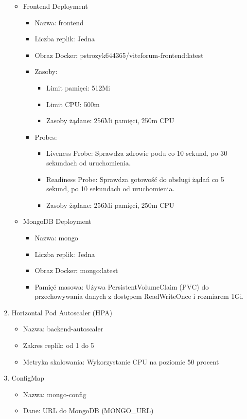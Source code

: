 \documentclass[12pt,a4paper]{article}
\begin{document}
\begin{enumerate}
\begin{itemize}
        
        \item Frontend Deployment
                          \begin{itemize}
                \item Nazwa: frontend
                \item Liczba replik: Jedna
                \item Obraz Docker: pstrozyk644365/viteforum-frontend:latest
                        \item Zasoby:
                \begin{itemize}
                \item Limit pamięci: 512Mi
                \item Limit CPU: 500m
                \item  Zasoby żądane: 256Mi pamięci, 250m CPU
                \end{itemize}
        \item Probes:
                \begin{itemize}
                \item Liveness Probe: Sprawdza zdrowie podu co 10 sekund, po 30 sekundach od uruchomienia.
                \item Readiness Probe: Sprawdza gotowość do obsługi żądań co 5 sekund, po 10 sekundach od uruchomienia.
                \item  Zasoby żądane: 256Mi pamięci, 250m CPU
                \end{itemize}
                \end{itemize}
        \item MongoDB Deployment
                                         \begin{itemize}
                \item Nazwa: mongo
                \item Liczba replik: Jedna
                \item Obraz Docker: mongo:latest
                 \item       Pamięć masowa: Używa PersistentVolumeClaim (PVC) do przechowywania danych z dostępem ReadWriteOnce i rozmiarem 1Gi.
                \end{itemize}
    \end{itemize}
    \item Horizontal Pod Autoscaler (HPA)
            \begin{itemize}
                \item Nazwa: backend-autoscaler
                \item Zakres replik: od 1 do 5
                \item Metryka skalowania: Wykorzystanie CPU na poziomie 50 procent
            \end{itemize}
    \item ConfigMap
                   \begin{itemize}
                \item Nazwa: mongo-config
                \item Dane: URL do MongoDB (MONGO\_URL)


\end{itemize}
\end{enumerate}
\end{document}
